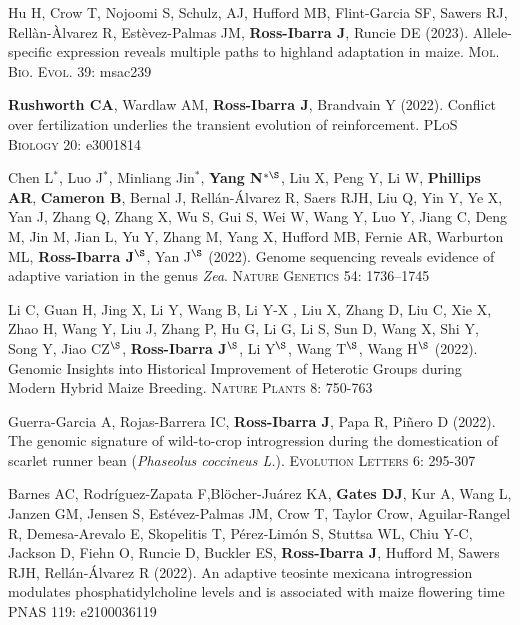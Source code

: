 \documentclass[letterpaper,10pt]{article}
\begin{document}
\begin{etaremune}
\item Hu H, Crow T, Nojoomi S, Schulz, AJ, Hufford MB, Flint-Garcia SF, Sawers RJ, Rell\`{a}n-\`{A}lvarez R, Est\`{e}vez-Palmas JM, \textbf{Ross-Ibarra J}, Runcie DE (2023). Allele-specific expression reveals multiple paths to highland adaptation in maize. \textsc{Mol. Bio. Evol.} 39: msac239

\item \textbf{Rushworth CA}, Wardlaw AM, \textbf{Ross-Ibarra J}, Brandvain Y (2022). Conflict over fertilization underlies the transient evolution of reinforcement. \textsc{PLoS Biology} 20: e3001814 %

\item Chen L$^*$, Luo J$^*$, Minliang Jin$^*$, \textbf{Yang N$^{*\S}$}, Liu X, Peng Y, Li W, \textbf{Phillips AR}, \textbf{Cameron B}, Bernal J, Rell\'{a}n-\'{A}lvarez R, Saers RJH, Liu Q, Yin Y, Ye X, Yan J, Zhang Q, Zhang X, Wu S, Gui S, Wei W, Wang Y, Luo Y, Jiang C, Deng M, Jin M, Jian L, Yu Y, Zhang M, Yang X, Hufford MB, Fernie AR, Warburton ML, \textbf{Ross-Ibarra J$^\S$}, Yan J$^\S$ (2022). Genome sequencing reveals evidence of adaptive variation in the genus \textit{Zea}. \textsc{Nature Genetics} 54: 1736–1745

\item Li C, Guan H, Jing X, Li Y, Wang B, Li Y-X , Liu X, Zhang D, Liu C, Xie X, Zhao H, Wang Y, Liu J, Zhang P, Hu G, Li G, Li S, Sun D, Wang X, Shi Y, Song Y, Jiao CZ$^\S$, \textbf{Ross-Ibarra J}$^\S$, Li Y$^\S$, Wang T$^\S$, Wang H$^\S$ (2022). Genomic Insights into Historical Improvement of Heterotic Groups during Modern Hybrid Maize Breeding. \textsc{Nature Plants} 8: 750-763

\item Guerra-Garcia A, Rojas-Barrera IC, \textbf{Ross-Ibarra J}, Papa R, Pi\~nero D (2022). The genomic signature of wild-to-crop introgression during the domestication of scarlet runner bean (\textit{Phaseolus coccineus L.}). \textsc{Evolution Letters} 6: 295-307 %

\item Barnes AC, Rodr\'iguez-Zapata F,Bl\"{o}cher-Ju\'arez KA, \textbf{Gates DJ}, Kur A,  Wang L, Janzen GM,  Jensen S, Est\'evez-Palmas JM, Crow T, Taylor Crow, Aguilar-Rangel R, Demesa-Arevalo E, Skopelitis T, P\'erez-Lim\'on S, Stuttsa WL, Chiu Y-C, Jackson D, Fiehn O, Runcie D, Buckler ES, \textbf{Ross-Ibarra J}, Hufford M, Sawers RJH, Rell\'an-\'Alvarez R (2022). An adaptive teosinte mexicana introgression modulates phosphatidylcholine levels and is associated with maize flowering time \textsc{PNAS} 119: e2100036119  %


\end{etaremune}
\end{document}
